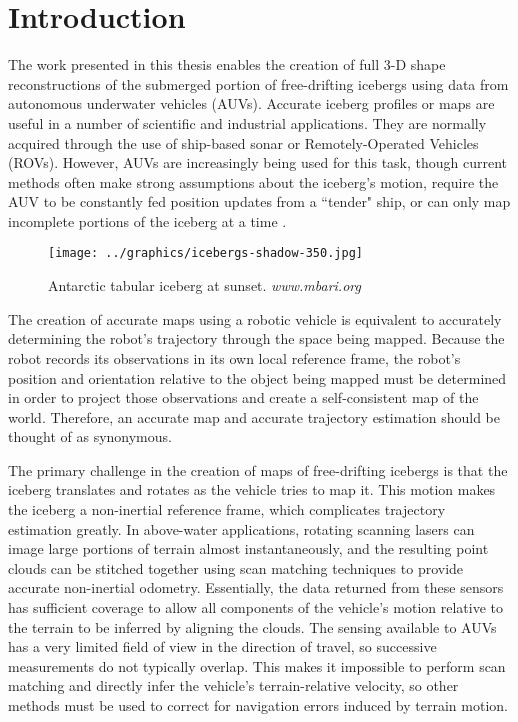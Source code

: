 
\chapter{Introduction}
\label{ch.Introduction}
The work presented in this thesis enables the creation of full 3-D shape reconstructions of the submerged portion of free-drifting icebergs using data from autonomous underwater vehicles (AUVs). Accurate iceberg profiles or maps are useful in a number of scientific and industrial applications. They are normally acquired through the use of ship-based sonar or Remotely-Operated Vehicles (ROVs). However, AUVs are increasingly being used for this task, though current methods often make strong assumptions about the iceberg's motion, require the AUV to be constantly fed position updates from a ``tender" ship, or can only map incomplete portions of the iceberg at a time \cite{Kimball2011b}.

\begin{figure}[htbp]
   \centering
   \texttt{[image: ../graphics/icebergs-shadow-350.jpg]} %
   \caption{Antarctic tabular iceberg at sunset. \emph{www.mbari.org}}
   \label{fig:IcebergSunset}
\end{figure}

The creation of accurate maps using a robotic vehicle is equivalent to accurately determining the robot's trajectory through the space being mapped. Because the robot records its observations in its own local reference frame, the robot's position and orientation relative to the object being mapped must be determined in order to project those observations and create a self-consistent map of the world. Therefore, an accurate map and accurate trajectory estimation should be thought of as synonymous.

The primary challenge in the creation of maps of free-drifting icebergs is that the iceberg translates and rotates as the vehicle tries to map it. This motion makes the iceberg a non-inertial reference frame, which complicates trajectory estimation greatly. In above-water applications, rotating scanning lasers can image large portions of terrain almost instantaneously, and the resulting point clouds can be stitched together using scan matching techniques to provide accurate non-inertial odometry. Essentially, the data returned from these sensors has sufficient coverage to allow all components of the vehicle's motion relative to the terrain to be inferred by aligning the clouds. The sensing available to AUVs has a very limited field of view in the direction of travel, so successive measurements do not typically overlap. This makes it impossible to perform scan matching and directly infer the vehicle's terrain-relative velocity, so other methods must be used to correct for navigation errors induced by terrain motion. 


